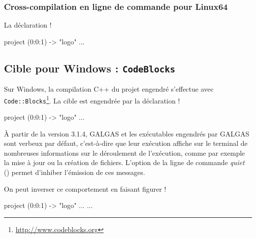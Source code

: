 \subsubsection{Cross-compilation en ligne de commande pour Linux64}

La déclaration \ggs!%

\begin{galgas}
project (0:0:1) -> "logo" {
  ...
}
\end{galgas}



\subsection{Cible pour Windows : \texttt{CodeBlocks}}

Sur Windows, la compilation C++ du projet engendré s'effectue avec \texttt{Code::Blocks}\footnote{\url{http://www.codeblocks.org}}. La cible est engendrée par la déclaration \ggs!%

\begin{galgas}
project (0:0:1) -> "logo" {
  ...
}
\end{galgas}






À partir de la version 3.1.4, GALGAS et les exécutables engendrés par GALGAS sont verbeux par défaut, c'est-à-dire que leur exécution affiche sur le terminal de nombreuses informations sur le déroulement de l'exécution, comme par exemple la mise à jour ou la création de fichiers. L'option de la ligne de commande \emph{quiet} () permet d'inhiber l'émission de ces messages.

On peut inverser ce comportement en faisant figurer \ggs!%
\begin{galgas}
project (0:0:1) -> "logo" {
  ...
  ...
}
\end{galgas}

